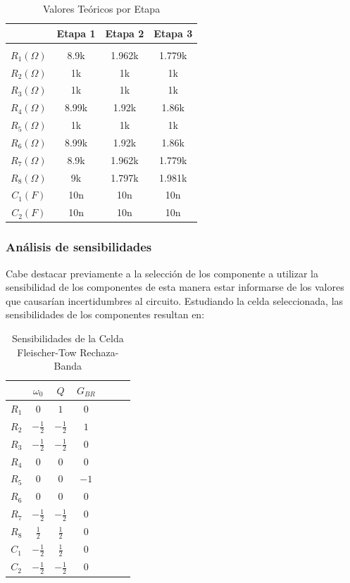 \begin{table}[H]
	\centering
	\begin{tabular}{c c c c}
		&Etapa 1& Etapa 2 & Etapa 3 \\
		\hline \\
    		$R_1 (\Omega)$ & 8.9k & 1.962k& 1.779k \\
		$R_2 (\Omega)$ & 1k&1k &1k \\
		$R_3 (\Omega)$ & 1k & 1k& 1k \\
		$R_4 (\Omega)$ &8.99k  &1.92k & 1.86k\\
		$R_5 (\Omega)$ &1k & 1k&1k \\
		$R_6 (\Omega)$ &8.99k  &1.92k & 1.86k \\
		$R_7 (\Omega)$ & 8.9k & 1.962k& 1.779k \\
		$R_8 (\Omega)$ & 9k& 1.797k&1.981k \\
		$C_1 (F)$ & 10n&10n &10n \\
		$C_2 (F)$ & 10n&10n &10n \\
		\hline
	\end{tabular}
	\caption{Valores Teóricos por Etapa}
	\label{ej4valt}
\end{table}

\subsubsection{Análisis de sensibilidades}

Cabe destacar previamente a la selección de los componente a utilizar la sensibilidad de los componentes de esta manera estar informarse de los valores que causarían incertidumbres al circuito. Estudiando la celda seleccionada, las sensibilidades de los componentes resultan en:

\begin{table}[H]
	\centering
	\begin{tabular}{c c c c c c c}
		& $\omega_0$ & $Q$ & $G_{BR}$\\
		\hline  
		$R_1$ & $0$ & $1$ & $0$\\ 
		$R_2$ & $-\frac{1}{2}$ & $-\frac{1}{2}$ & $1$\\ 
		$R_3$ & $-\frac{1}{2}$ & $-\frac{1}{2}$ & $0$\\ 
		$R_4$ & $0$ & $0$ & $0$\\ 
		$R_5$ & $0$ & $0$  & $-1$\\ 
		$R_6$ & $0$ & $0$ & $0$\\ 
		$R_7$ & $-\frac{1}{2}$ & $-\frac{1}{2}$ & $0$\\ 
		$R_8$ & $\frac{1}{2}$ & $\frac{1}{2}$ & $0$\\ 
		$C_1$ & $-\frac{1}{2}$ & $\frac{1}{2}$  & $0$\\ 
		$C_2$ & $-\frac{1}{2}$ & $-\frac{1}{2}$ &$0$\\ 
		\hline
	\end{tabular}
	\caption{Sensibilidades de la Celda Fleischer-Tow Rechaza-Banda}
	\label{ej4sens}
\end{table}

